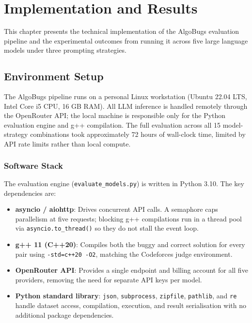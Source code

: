 \chapter{Implementation and Results}
This chapter presents the technical implementation of the AlgoBugs evaluation pipeline and the experimental outcomes from running it across five large language models under three prompting strategies.

\section{Environment Setup}

The AlgoBugs pipeline runs on a personal Linux workstation (Ubuntu 22.04 LTS, Intel Core i5 CPU, 16 GB RAM). All LLM inference is handled remotely through the OpenRouter API; the local machine is responsible only for the Python evaluation engine and g++ compilation. The full evaluation across all 15 model-strategy combinations took approximately 72 hours of wall-clock time, limited by API rate limits rather than local compute.

\subsection{Software Stack}

The evaluation engine (\texttt{evaluate\_models.py}) is written in Python 3.10. The key dependencies are:

\begin{itemize}
    \item \textbf{asyncio / aiohttp}: Drives concurrent API calls. A semaphore caps parallelism at five requests; blocking g++ compilations run in a thread pool via \texttt{asyncio.to\_thread()} so they do not stall the event loop.
    \item \textbf{g++ 11 (C++20)}: Compiles both the buggy and correct solution for every pair using \texttt{-std=c++20 -O2}, matching the Codeforces judge environment.
    \item \textbf{OpenRouter API}: Provides a single endpoint and billing account for all five providers, removing the need for separate API keys per model.
    \item \textbf{Python standard library}: \texttt{json}, \texttt{subprocess}, \texttt{zipfile}, \texttt{pathlib}, and \texttt{re} handle dataset access, compilation, execution, and result serialisation with no additional package dependencies.
\end{itemize}

